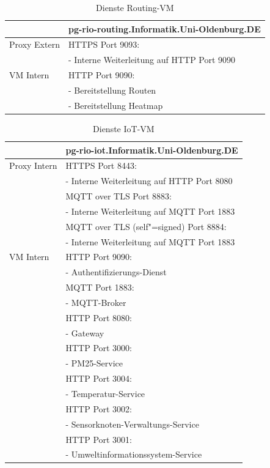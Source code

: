 \begin{table}[H]\caption{Dienste Routing-VM}\label{tbl:dierouting}
\begin{tabularx}{\textwidth}{|l|X|}
	\hline
	&  \textbf{pg-rio-routing.Informatik.Uni-Oldenburg.DE}\\ 
	\hline Proxy Extern
	& HTTPS Port 9093:\\
	& - Interne Weiterleitung auf HTTP Port 9090\\
	\hline VM Intern
	&  HTTP Port 9090:\\
	& - Bereitstellung Routen\\
	& - Bereitstellung Heatmap\\	 
	\hline
\end{tabularx}
\end{table} 
\par\bigskip

\begin{table}[H]\caption{Dienste IoT-VM}\label{tbl:dieiot}
\begin{tabularx}{\textwidth}{|l|X|}
	\hline
	&  \textbf{pg-rio-iot.Informatik.Uni-Oldenburg.DE}\\ 
	\hline Proxy Intern
	& HTTPS Port 8443:\\
	& - Interne Weiterleitung auf HTTP Port 8080\\
	& MQTT over TLS Port 8883:\\
	& - Interne Weiterleitung auf MQTT Port 1883\\
	& MQTT over TLS (self"=signed) Port 8884:\\
	& - Interne Weiterleitung auf MQTT Port 1883\\ 
	\hline VM Intern
	&  HTTP Port 9090:\\
	& - Authentifizierungs-Dienst\\
	&MQTT Port 1883:\\
	& - MQTT-Broker\\	
	&HTTP Port 8080:\\
	& - Gateway\\	
	&HTTP Port 3000:\\
	& - PM25-Service\\	
	&HTTP Port 3004:\\
	& - Temperatur-Service\\	
	&HTTP Port 3002:\\
	& - Sensorknoten-Verwaltungs-Service\\	
	&HTTP Port 3001:\\
	& - Umweltinformationssystem-Service\\		 
	\hline
\end{tabularx}
\end{table} 
\par\bigskip 

